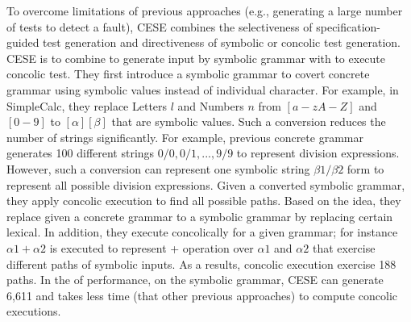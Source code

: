 \begin{enumerate}
To overcome limitations of previous approaches (e.g., generating a large number of tests to detect a fault), CESE combines the selectiveness of specification-guided test generation and directiveness of symbolic or concolic test generation. CESE is to combine to generate input by symbolic grammar with to execute concolic test. They first introduce a symbolic grammar to covert concrete grammar using symbolic values instead of individual character. For example, in SimpleCalc, they replace Letters $l$ and Numbers $n$ from $[a-zA-Z]$ and $[0-9]$ to $[\alpha][\beta]$ that are symbolic values. Such a conversion reduces the number of strings significantly. For example, previous concrete grammar generates 100 different strings $0/0, 0/1,..., 9/9$ to represent division expressions. However, such a conversion can represent one symbolic string $\beta1 / \beta2$ form to represent all possible division expressions. Given a converted symbolic grammar, they apply concolic execution to find all possible paths. Based on the idea, they replace given a concrete grammar to a symbolic grammar by replacing certain lexical. In addition, they execute concolically for a given grammar; for instance $\alpha1 + \alpha2$ is executed to represent +  operation over $\alpha1$ and $\alpha2$ that exercise different paths of symbolic inputs. As a results, concolic execution exercise 188 paths. In the of performance, on the symbolic grammar, CESE can generate 6,611 and takes less time (that other previous approaches) to compute concolic executions.

 
 
 \end{enumerate}
 